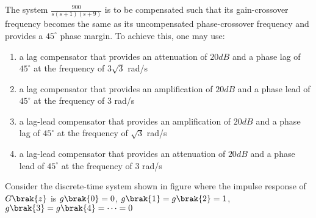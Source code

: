 \iffalse
\title{Assignment1}
\author{ee24btech1064}
\chapter{2007}
\section{ee}
\fi
\item The system $\frac{900}{s(s + 1)(s + 9)}$ is to be compensated such that its gain-crossover frequency becomes the same as its uncompensated phase-crossover frequency and provides a $45^\circ$ phase margin. To achieve this, one may use:
\begin{enumerate}
    \item a lag compensator that provides an attenuation of $20dB$ and a phase lag of $45^\circ$ at the frequency of $3\sqrt{3}$ rad/s
    \item  a lag compensator that provides an amplification of $20dB$ and a phase lead of $45^\circ$ at the frequency of $3$ rad/s
    \item  a lag-lead compensator that provides an amplification of $20dB$ and a phase lag of $45^\circ$ at the frequency of $\sqrt{3}$ rad/s
    \item  a lag-lead compensator that provides an attenuation of $20dB$ and a phase lead of $45^\circ$ at the frequency of $3$ rad/s
\end{enumerate}
\item Consider the discrete-time system shown in figure where the impulse response of $G\brak{z}$ is $g\brak{0}=0$, $g\brak{1}=g\brak{2}=1$,  $g\brak{3}=g\brak{4}=\cdots=0$
    

